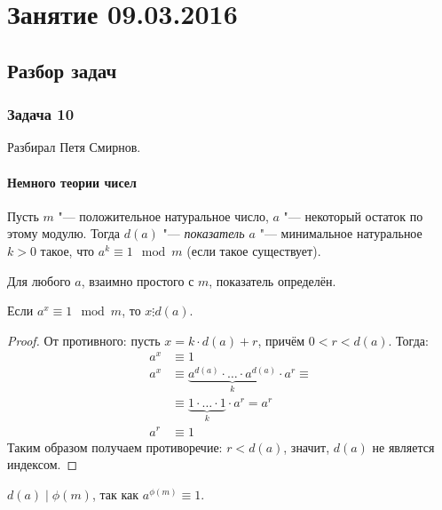 \chapter{Занятие 09.03.2016}

\section{Разбор задач}
\subsection{Задача 10}
	Разбирал Петя Смирнов.

	\subsubsection{Немного теории чисел}
		\begin{Def}
			Пусть $m$ "--- положительное натуральное число, $a$ "--- некоторый остаток по этому модулю.
			Тогда $d(a)$ "--- \textit{показатель $a$} "--- минимальное натуральное $k>0$ такое,
			что $a^k \equiv 1 \mod m$ (если такое существует).
		\end{Def}
		\begin{Rem}
			Для любого $a$, взаимно простого с $m$, показатель определён.
		\end{Rem}
		\begin{assertion}
			Если $a^x \equiv 1 \mod m$, то $x \vdots d(a)$.
		\end{assertion}
		\begin{proof}
			От противного: пусть $x=k\cdot d(a) + r$, причём $0 < r < d(a)$.
			Тогда:
			\begin{align*}
				a^x &\equiv 1 \\
				a^x &\equiv \underbrace{a^{d(a)} \cdot \dots \cdot a^{d(a)}}_{k} \cdot a^r \equiv \\
				&\equiv \underbrace{1 \cdot \dots \cdot 1}_{k} \cdot a^r = a^r \\
				a^r &\equiv 1
			\end{align*}
			Таким образом получаем противоречие: $r<d(a)$, значит, $d(a)$ не является индексом.
		\end{proof}
		\begin{conseq}
			$d(a)\mid\phi(m)$, так как $a^{\phi(m)} \equiv 1$.
		\end{conseq}

